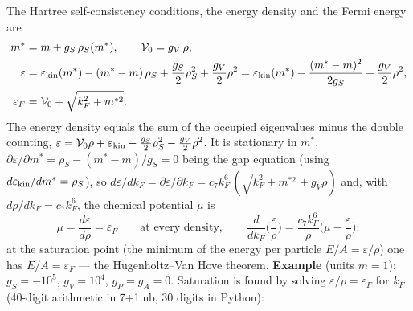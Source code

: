 \documentclass[10pt,a4paper]{article}
\begin{document}
The Hartree self-consistency conditions, the energy density and the Fermi energy are
\begin{align*}
m^*&=m+g_S\,\rho_S(m^*),\qquad \mathcal V_0=g_V\,\rho, \\
\varepsilon&=\varepsilon_{\rm kin}(m^*)-(m^*-m)\,\rho_S+\frac{g_S}{2}\rho_S^2+\frac{g_V}{2}\rho^2=\varepsilon_{\rm kin}(m^*)-\frac{(m^*-m)^2}{2g_S}+\frac{g_V}{2}\rho^2, \\
\varepsilon_F&=\mathcal V_0+\sqrt{k_F^2+m^{*2}} .
\end{align*}
The energy density equals the sum of the occupied eigenvalues minus the double counting, $\varepsilon=\mathcal V_0\rho+\varepsilon_{\rm kin}-\tfrac{g_S}{2}\rho_S^2-\tfrac{g_V}{2}\rho^2$. It is stationary in $m^*$, $\partial\varepsilon/\partial m^*=\rho_S-(m^*-m)/g_S=0$ being the gap equation (using $d\varepsilon_{\rm kin}/dm^*=\rho_S$), so $d\varepsilon/dk_F=\partial\varepsilon/\partial k_F=c_7k_F^6\,(\sqrt{k_F^2+m^{*2}}+g_V\rho)$ and, with $d\rho/dk_F=c_7k_F^6$, the chemical potential $\mu$ is
\begin{equation*}
\mu=\frac{d\varepsilon}{d\rho}=\varepsilon_F\qquad\text{at every density},\qquad \frac{d}{dk_F}\Big(\frac{\varepsilon}{\rho}\Big)=\frac{c_7k_F^6}{\rho}\Big(\mu-\frac{\varepsilon}{\rho}\Big):
\end{equation*}
at the saturation point (the minimum of the energy per particle $E/A=\varepsilon/\rho$) one has $E/A=\varepsilon_F$ — the Hugenholtz–Van Hove theorem. \textbf{Example} (units $m=1$): $g_S=-10^5$, $g_V=10^4$, $g_P=g_A=0$. Saturation is found by solving $\varepsilon/\rho=\varepsilon_F$ for $k_F$ (40-digit arithmetic in 7+1.nb, 30 digits in Python):
\end{document}

